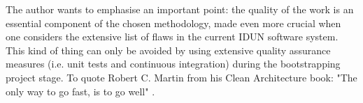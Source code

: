 The author wants to emphasise an important point: the quality of the work is an essential component of the chosen methodology, made even more crucial when one considers the extensive list of flaws in the current IDUN software system. This kind of thing can only be avoided by using extensive quality assurance measures (i.e. unit tests and continuous integration) during the bootstrapping project stage. To quote Robert C. Martin from his Clean Architecture book: "The only way to go fast, is to go well" \citep{martin_clean_2018}.

